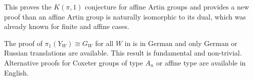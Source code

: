 \documentclass[class=article, crop=false]{standalone}
\begin{document}
This proves the $K(\pi, 1)$ conjecture for affine Artin groups and provides a new proof than an affine Artin group is naturally isomorphic to its dual, which was already known for finite \cite{bessis_dual_2003} and affine \cite{mccammond_sulway_artin_2017} cases.

The proof of $\pi_1(Y_W) \cong G_W$ for all $W$ in \cite{brieskorn_fundamentalgruppe_1971} is in German and only German or Russian translations are available. This result is fundamental and non-trivial. Alternative proofs for Coxeter groups of type $A_n$ \cite{fox_braid_1962} or affine type \cite{viet_dung_fundamental_1983} are available in English.
\end{document}
